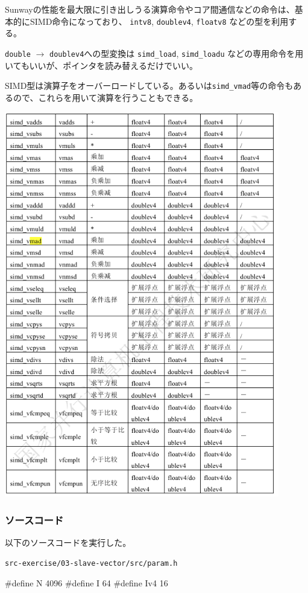 Sunwayの性能を最大限に引き出しうる演算命令やコア間通信などの命令は、基本的にSIMD命令になっており、
\verb`intv8`,
\verb`doublev4`,
\verb`floatv8`
などの型を利用する。

\verb`double` $\to$ \verb`doublev4`への型変換は
 \verb`simd_load`,  \verb`simd_loadu`
 などの専用命令を用いてもいいが、ポインタを読み替えるだけでいい。

 SIMD型は演算子をオーバーロードしている。あるいは\verb`simd_vmad`等の命令もあるので、これらを用いて演算を行うこともできる。
\begin{center}
  \includegraphics[width=12cm]{figure/sunway-simd.png}
  \end{center}

\subsubsection{ソースコード}
以下のソースコードを実行した。

\verb`src-exercise/03-slave-vector/src/param.h`
\begin{code}
#define N 4096
#define I 64
#define Iv4 16

\end{code}

